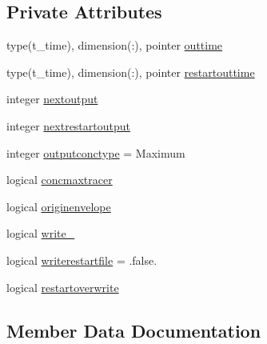 \subsection*{Private Attributes}
\begin{DoxyCompactItemize}
\item 
type(t\+\_\+time), dimension(\+:), pointer \mbox{\hyperlink{structmodulelagrangian_1_1t__output_a7cc24fa91fef209bdedc48b2be6eb9cc}{outtime}}
\item 
type(t\+\_\+time), dimension(\+:), pointer \mbox{\hyperlink{structmodulelagrangian_1_1t__output_ad73cb68666afa77cbe588397d45cb29a}{restartouttime}}
\item 
integer \mbox{\hyperlink{structmodulelagrangian_1_1t__output_aba45fb45e7132c079da0b4700ae279b4}{nextoutput}}
\item 
integer \mbox{\hyperlink{structmodulelagrangian_1_1t__output_a4f82f05df514322922326f392b0af8d3}{nextrestartoutput}}
\item 
integer \mbox{\hyperlink{structmodulelagrangian_1_1t__output_aa81e52eaba9c2068be29d7ed95922475}{outputconctype}} = Maximum
\item 
logical \mbox{\hyperlink{structmodulelagrangian_1_1t__output_a33d4a45cca4dcec2fa96a9a304fcfb55}{concmaxtracer}}
\item 
logical \mbox{\hyperlink{structmodulelagrangian_1_1t__output_ad16bcd6fb088e598f75e9f16d4c3afdc}{originenvelope}}
\item 
logical \mbox{\hyperlink{structmodulelagrangian_1_1t__output_a2571c9dfaa99bd184cca1ea0819b318a}{write\+\_\+}}
\item 
logical \mbox{\hyperlink{structmodulelagrangian_1_1t__output_aba8c1648ae7b14de7cffd1d55978adce}{writerestartfile}} = .false.
\item 
logical \mbox{\hyperlink{structmodulelagrangian_1_1t__output_a78fae6493d7141d8f4b28cd1eff8fa30}{restartoverwrite}}
\end{DoxyCompactItemize}


\subsection{Member Data Documentation}
\mbox{\label{structmodulelagrangian_1_1t__output_a33d4a45cca4dcec2fa96a9a304fcfb55}} 
